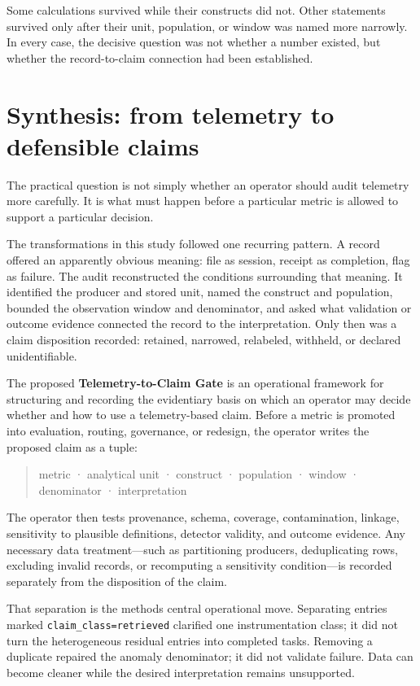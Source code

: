 \documentclass[12pt]{article}
\begin{document}
Some calculations survived while their constructs did not. Other statements survived only after their unit, population, or window was named more narrowly. In every case, the decisive question was not whether a number existed, but whether the record-to-claim connection had been established.

\section{Synthesis: from telemetry to defensible claims}\label{synthesis-from-telemetry-to-defensible-claims}

The practical question is not simply whether an operator should audit telemetry more carefully. It is what must happen before a particular metric is allowed to support a particular decision.

The transformations in this study followed one recurring pattern. A record offered an apparently obvious meaning: file as session, receipt as completion, flag as failure. The audit reconstructed the conditions surrounding that meaning. It identified the producer and stored unit, named the construct and population, bounded the observation window and denominator, and asked what validation or outcome evidence connected the record to the interpretation. Only then was a claim disposition recorded: retained, narrowed, relabeled, withheld, or declared unidentifiable.

The proposed \textbf{Telemetry-to-Claim Gate} is an operational framework for structuring and recording the evidentiary basis on which an operator may decide whether and how to use a telemetry-based claim. Before a metric is promoted into evaluation, routing, governance, or redesign, the operator writes the proposed claim as a tuple:

\begin{quote}
metric · analytical unit · construct · population · window · denominator · interpretation
\end{quote}

The operator then tests provenance, schema, coverage, contamination, linkage, sensitivity to plausible definitions, detector validity, and outcome evidence. Any necessary data treatment---such as partitioning producers, deduplicating rows, excluding invalid records, or recomputing a sensitivity condition---is recorded separately from the disposition of the claim.

That separation is the method\textquotesingle s central operational move. Separating entries marked \texttt{claim\_\allowbreak class=\allowbreak retrieved} clarified one instrumentation class; it did not turn the heterogeneous residual entries into completed tasks. Removing a duplicate repaired the anomaly denominator; it did not validate failure. Data can become cleaner while the desired interpretation remains unsupported.
\end{document}
